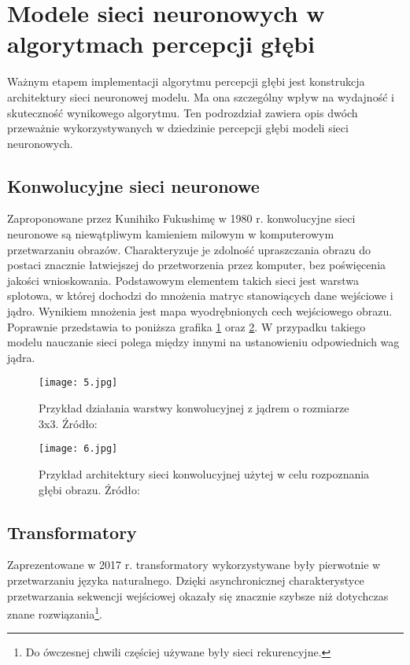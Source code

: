 \section{Modele sieci neuronowych w algorytmach percepcji głębi}
Ważnym etapem implementacji algorytmu percepcji głębi jest konstrukcja architektury sieci neuronowej modelu. Ma ona szczególny wpływ na wydajność i skuteczność wynikowego algorytmu. Ten podrozdział zawiera opis dwóch przeważnie wykorzystywanych w dziedzinie percepcji głębi modeli sieci neuronowych.
\subsection{Konwolucyjne sieci neuronowe}
Zaproponowane przez Kunihiko Fukushimę w 1980 r. \cite{fukushima1980} konwolucyjne sieci neuronowe są niewątpliwym kamieniem milowym w komputerowym przetwarzaniu obrazów. Charakteryzuje je zdolność upraszczania obrazu do postaci znacznie łatwiejszej do przetworzenia przez komputer, bez poświęcenia jakości wnioskowania. Podstawowym elementem takich sieci jest warstwa splotowa, w której dochodzi do mnożenia matryc stanowiących dane wejściowe i jądro. Wynikiem mnożenia jest mapa wyodrębnionych cech wejściowego obrazu. Poprawnie przedstawia to poniższa grafika \ref{fig:warstwa-konwolucyjna} oraz \ref{fig:warstwa-konwolucyjna-arch}. W przypadku takiego modelu nauczanie sieci polega między innymi na ustanowieniu odpowiednich wag jądra.
\begin{figure}[H]
    \centering
    \texttt{[image: 5.jpg]}
    \caption{Przykład działania warstwy konwolucyjnej z jądrem o rozmiarze 3x3. Źródło: \cite{dumoulin2018}}
    \label{fig:warstwa-konwolucyjna}
\end{figure}
\begin{figure}[H]
    \centering
    \texttt{[image: 6.jpg]}
    \caption{Przykład architektury sieci konwolucyjnej użytej w celu rozpoznania głębi obrazu. Źródło: \cite{dong2022}}
    \label{fig:warstwa-konwolucyjna-arch}
\end{figure}

\subsection{Transformatory}
Zaprezentowane w 2017 r. \cite{vaswani2017} transformatory wykorzystywane były pierwotnie w przetwarzaniu języka naturalnego. Dzięki asynchronicznej charakterystyce przetwarzania sekwencji wejściowej okazały się znacznie szybsze niż dotychczas znane rozwiązania\footnote{Do ówczesnej chwili częściej używane były sieci rekurencyjne.}.

